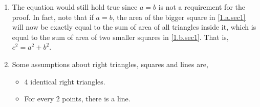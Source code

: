 \begin{pr}
\begin{enumerate}[label=\textbf{(\alph*)}]
        \item The equation would still hold true since $a = b$ is not
        a requirement for the proof. In fact, note that if $a = b$,
        the area of the bigger square in \ref{1.a.sec1} will now be
        exactly equal to the sum of area of all triangles inside it,
        which is equal to the sum of area of two smaller squares in \ref{1.b.sec1}.
        That is, $c^2 = a^2 + b^2$.

        \item Some assumptions about right triangles, squares and lines are,
        \begin{itemize}
            \item 4 identical right triangles.
            \item For every 2 points, there is a line.
        \end{itemize}
    \end{enumerate}
\end{pr}

